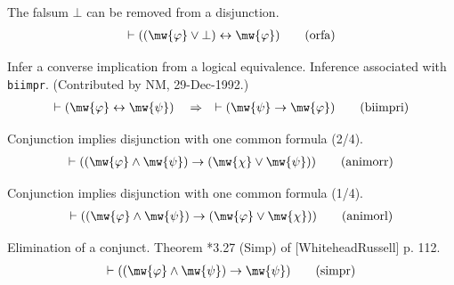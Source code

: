 \begin{lemma} The falsum $\bot$ can be removed from a
disjunction.  
\begin{align}
\vdash ( ( \mw{\varphi} \vee \bot ) \leftrightarrow \mw{\varphi}
    )\label{eq:orfa}\tag{orfa}
\end{align}
\end{lemma}


\begin{lemma} Infer a converse implication from a logical
equivalence.  Inference
       associated with {\tt biimpr}.  (Contributed by NM, 29-Dec-1992.) 
\begin{align}
\vdash ( \mw{\varphi} \leftrightarrow \mw{\psi} )\quad\Rightarrow\quad \vdash (
    \mw{\psi} \rightarrow \mw{\varphi} )\label{eq:biimpri}\tag{biimpri}
\end{align}
\end{lemma}


\begin{lemma} Conjunction implies disjunction with one
common formula (2/4).
\begin{align}
\vdash ( ( \mw{\varphi} \wedge \mw{\psi} ) \rightarrow ( \mw{\chi} \vee
    \mw{\psi} ) )\label{eq:animorr}\tag{animorr}
\end{align}
\end{lemma}


\begin{lemma} Conjunction implies disjunction with one
common formula (1/4).
\begin{align}
\vdash ( ( \mw{\varphi} \wedge \mw{\psi} ) \rightarrow ( \mw{\varphi} \vee
    \mw{\chi} ) )\label{eq:animorl}\tag{animorl}
\end{align}
\end{lemma}


\begin{lemma} Elimination of a conjunct.  Theorem *3.27
(Simp) of [WhiteheadRussell]
     p. 112.  
\begin{align}
\vdash ( ( \mw{\varphi} \wedge \mw{\psi} ) \rightarrow \mw{\psi}
    )\label{eq:simpr}\tag{simpr}
\end{align}
\end{lemma}


